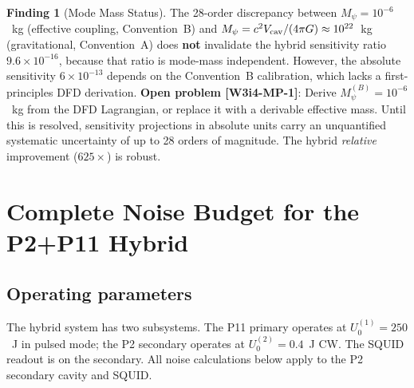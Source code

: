\documentclass[11pt,twocolumn]{article}
\newcommand{\Mpsi}{M_\psi}
\newcommand{\ee}[1]{\times 10^{#1}}
\newcommand{\VcavSym}{V_{\rm cav}}
\theoremstyle{definition}
\newtheorem{finding}[theorem]{Finding}
\theoremstyle{remark}
\begin{document}
\begin{finding}[Mode Mass Status]
\label{find:mode_mass}
The 28-order discrepancy between $\Mpsi = 10^{-6}$~kg (effective coupling,
Convention~B) and $\Mpsi = c^2\VcavSym/(4\pi G) \approx 10^{22}$~kg
(gravitational, Convention~A) does \textbf{not} invalidate the hybrid
sensitivity ratio $9.6\ee{-16}$, because that ratio is mode-mass independent.
However, the absolute sensitivity $6\ee{-13}$ depends on the Convention~B
calibration, which lacks a first-principles DFD derivation.
\textbf{Open problem [W3i4-MP-1]}: Derive $\Mpsi^{(B)} = 10^{-6}$~kg
from the DFD Lagrangian, or replace it with a derivable effective mass.
Until this is resolved, sensitivity projections in absolute units carry
an unquantified systematic uncertainty of up to 28 orders of magnitude.
The hybrid \emph{relative} improvement ($625\times$) is robust.
\end{finding}

\section{Complete Noise Budget for the P2+P11 Hybrid}
\label{sec:noise_budget}

\subsection{Operating parameters}
\label{sec:operating_params}

The hybrid system has two subsystems. The P11 primary operates at
$U_0^{(1)} = 250$~J in pulsed mode; the P2 secondary operates at
$U_0^{(2)} = 0.4$~J CW. The SQUID readout is on the secondary.
All noise calculations below apply to the P2 secondary cavity and SQUID.
\end{document}
